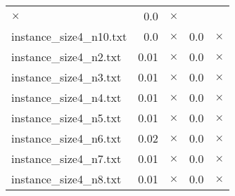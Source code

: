 \documentclass{article}
\begin{document}
\begin{center}
\begin{tabular}{lrrrr}
$\times$
 & 0.0 & 
$\times$
\\
instance\_size4\_n10.txt & 0.0 & 
$\times$
 & 0.0 & 
$\times$
\\
instance\_size4\_n2.txt & 0.01 & 
$\times$
 & 0.0 & 
$\times$
\\
instance\_size4\_n3.txt & 0.01 & 
$\times$
 & 0.0 & 
$\times$
\\
instance\_size4\_n4.txt & 0.01 & 
$\times$
 & 0.0 & 
$\times$
\\
instance\_size4\_n5.txt & 0.01 & 
$\times$
 & 0.0 & 
$\times$
\\
instance\_size4\_n6.txt & 0.02 & 
$\times$
 & 0.0 & 
$\times$
\\
instance\_size4\_n7.txt & 0.01 & 
$\times$
 & 0.0 & 
$\times$
\\
instance\_size4\_n8.txt & 0.01 & 
$\times$
 & 0.0 & 
$\times$
\\
\hline\end{tabular}
\end{center}
\end{document}
